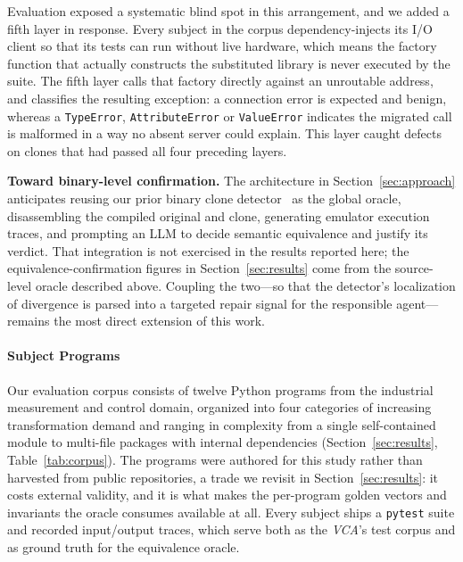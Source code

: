 Evaluation exposed a systematic blind spot in this arrangement, and we added a fifth layer in response. Every subject in the corpus dependency-injects its I/O client so that its tests can run without live hardware, which means the factory function that actually constructs the substituted library is never executed by the suite. The fifth layer calls that factory directly against an unroutable address, and classifies the resulting exception: a connection error is expected and benign, whereas a \texttt{TypeError}, \texttt{AttributeError} or \texttt{ValueError} indicates the migrated call is malformed in a way no absent server could explain. This layer caught defects on clones that had passed all four preceding layers.

\textbf{Toward binary-level confirmation.}
The architecture in Section~\ref{sec:approach} anticipates reusing our prior binary clone detector~\cite{agadakos2025bcd} as the global oracle, disassembling the compiled original and clone, generating emulator execution traces, and prompting an LLM to decide semantic equivalence and justify its verdict. That integration is not exercised in the results reported here; the equivalence-confirmation figures in Section~\ref{sec:results} come from the source-level oracle described above. Coupling the two---so that the detector's localization of divergence is parsed into a targeted repair signal for the responsible agent---remains the most direct extension of this work.

\paragraph{Subject Programs}
Our evaluation corpus consists of twelve Python programs from the industrial measurement and control domain, organized into four categories of increasing transformation demand and ranging in complexity from a single self-contained module to multi-file packages with internal dependencies (Section~\ref{sec:results}, Table~\ref{tab:corpus}). The programs were authored for this study rather than harvested from public repositories, a trade we revisit in Section~\ref{sec:results}: it costs external validity, and it is what makes the per-program golden vectors and invariants the oracle consumes available at all. Every subject ships a \texttt{pytest} suite and recorded input/output traces, which serve both as the \emph{VCA}'s test corpus and as ground truth for the equivalence oracle.
